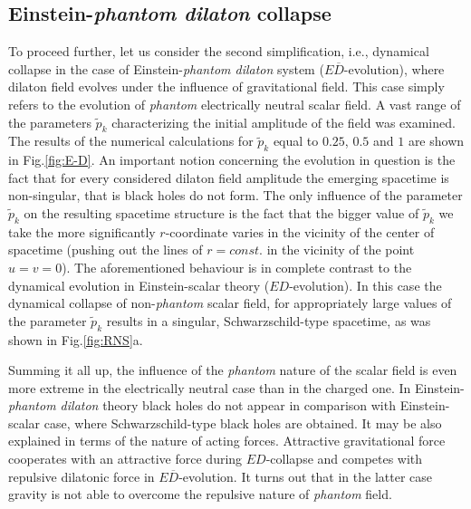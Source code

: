 \documentclass[aps,showpacs,nofootinbib,floatfix]{revtex4}
\newcommand{\tpe}{{\tilde p}}
\begin{document}
\subsection{Einstein-{\it phantom dilaton} collapse}
\label{sec:E-D}
To proceed further, let us consider the second simplification, i.e., dynamical collapse in the case
of Einstein-{\it phantom dilaton} system
({$E\overline{D}$}-evolution), where dilaton field evolves under the influence of gravitational field. 
This case simply refers to the evolution of {\it phantom} electrically neutral scalar field. 
A vast range of the parameters $\tpe_k$ characterizing the initial amplitude of the field was examined.
The results of the numerical calculations for $\tpe_k$ equal to $0.25$, $0.5$ and $1$ are shown in Fig.\ref{fig:E-D}. 
An important notion concerning the evolution in question is the fact that 
for every considered dilaton field amplitude the emerging spacetime is non-singular, that is black holes do not form. 
The only influence of the parameter $\tpe_k$ on the resulting
spacetime structure is the fact that 
the bigger value of $\tpe_k$ we take the more significantly $r$-coordinate varies in the vicinity of the center
of spacetime (pushing out the lines of $r=const.$ in the vicinity of the point $u=v=0$). 
The aforementioned behaviour is in complete contrast to the dynamical evolution in Einstein-scalar theory 
($ED$-evolution). In this case the dynamical collapse of non-{\it phantom}
scalar field, for appropriately large values of the parameter $\tpe_k$ results in a singular,
Schwarzschild-type spacetime, as was shown in Fig.\ref{fig:RNS}a.
\par
Summing it all up, the influence of the {\it phantom} nature of the scalar field is even more 
extreme in the electrically neutral case 
than in the charged one. In Einstein-{\it phantom dilaton} theory black holes do not appear in comparison with 
Einstein-scalar case, where Schwarzschild-type black holes are obtained. It may be also explained in terms of 
the nature of acting forces. Attractive gravitational force cooperates with an attractive force during $ED$-collapse 
and competes with repulsive dilatonic force in $E\overline{D}$-evolution. It turns out that in the latter case 
gravity is not able to overcome the repulsive nature of {\it phantom} field.
\end{document}
